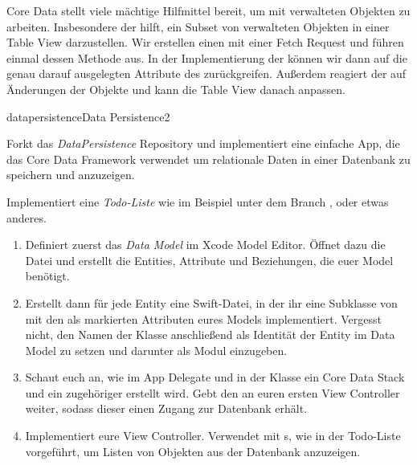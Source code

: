 \documentclass[parskip=half, final]{scrreprt}
\begin{document}
\begin{lecture}
Core Data stellt viele mächtige Hilfmittel bereit, um mit verwalteten Objekten zu arbeiten. Insbesondere der  hilft, ein Subset von verwalteten Objekten in einer Table View darzustellen. Wir erstellen einen  mit einer Fetch Request und führen einmal dessen  Methode aus. In der Implementierung der  können wir dann auf die genau darauf ausgelegten Attribute des  zurückgreifen. Außerdem reagiert der  auf Änderungen der Objekte und kann die Table View danach anpassen.


\begin{exc}

\begin{excitem}{datapersistence}{Data Persistence}{2}

Forkt das \emph{DataPersistence} Repository  und implementiert eine einfache App, die das Core Data Framework verwendet um relationale Daten in einer Datenbank zu speichern und anzuzeigen.

Implementiert eine \emph{Todo-Liste} wie im Beispiel unter dem Branch , oder etwas anderes.

\begin{enumerate}[label=\arabic*.]
\item Definiert zuerst das \emph{Data Model} im Xcode Model Editor. Öffnet dazu die  Datei und erstellt die Entities, Attribute und Beziehungen, die euer Model benötigt.
\item Erstellt dann für jede Entity eine Swift-Datei, in der ihr eine Subklasse von  mit den als  markierten Attributen eures Models implementiert. Vergesst nicht, den Namen der Klasse anschließend als Identität der Entity im Data Model zu setzen und darunter als Modul  einzugeben.
\item Schaut euch an, wie im App Delegate und in der  Klasse ein Core Data Stack und ein zugehöriger  erstellt wird. Gebt den  an euren ersten View Controller weiter, sodass dieser einen Zugang zur Datenbank erhält.
\item Implementiert eure View Controller. Verwendet  mit s, wie in der Todo-Liste vorgeführt, um Listen von Objekten aus der Datenbank anzuzeigen.


\end{enumerate}
\end{excitem}
\end{exc}
\end{lecture}
\end{document}

